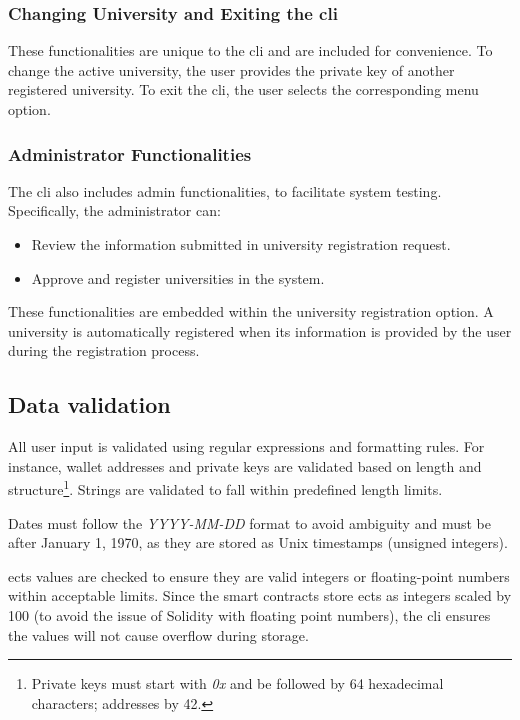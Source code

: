 \subsubsection{Changing University and Exiting the \acrshort{cli}}
These functionalities are unique to the \acrshort{cli} and are included for convenience. To change the active university, the user provides the private key of another registered university. To exit the \acrshort{cli}, the user selects the corresponding menu option.

\subsubsection{Administrator Functionalities}
The \acrshort{cli} also includes admin functionalities, to facilitate system testing. Specifically, the administrator can:
\begin{itemize}
    \item Review the information submitted in university registration request.
    \item Approve and register universities in the system.
\end{itemize}
These functionalities are embedded within the university registration option. A university is automatically registered when its information is provided by the user during the registration process.

\subsection{Data validation}
All user input is validated using regular expressions and formatting rules. For instance, wallet addresses and private keys are validated based on length and structure\footnote{Private keys must start with \textit{0x} and be followed by 64 hexadecimal characters; addresses by 42.}. Strings are validated to fall within predefined length limits.

Dates must follow the \textit{YYYY-MM-DD} format to avoid ambiguity and must be after January 1, 1970, as they are stored as Unix timestamps (unsigned integers). 

\acrshort{ects} values are checked to ensure they are valid integers or floating-point numbers within acceptable limits. Since the smart contracts store \acrshort{ects} as integers scaled by 100 (to avoid the issue of Solidity with floating point numbers), the \acrshort{cli} ensures the values will not cause overflow during storage.